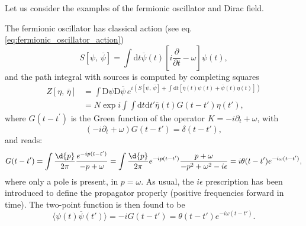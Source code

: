Let us consider the examples of the fermionic oscillator and Dirac field.

\begin{example}
    The fermionic oscillator has classical action (see eq. \eqref{eq:fermionic_oscillator_action})
    \[
        S[\psi,\,\overline{\psi}] = \int \mathrm{d}t \overline{\psi}(t) \left[ i \frac{\partial}{\partial t} - \omega \right] \psi(t),
    \]
    and the path integral with sources is computed by completing squares
    \[
        \begin{aligned}
            Z[\eta,\,\overline{\eta}] & = \int \mathrm{D} \psi \mathrm{D} \overline{\psi} \, e^{i \left( S[\psi,\,\overline{\psi}] + \int \mathrm{d}t \left[ \overline{\eta}(t) \psi(t) + \overline{\psi}(t) \eta(t) \right] \right)} \\
                                      & = N \exp{i \int \int \mathrm{d}t \mathrm{d}t' \overline{\eta}(t) G(t - t') \eta(t')},
        \end{aligned}
    \]
    where \(G(t-t^{\prime})\) is the Green function of the operator \(K = -i \partial_t + \omega\), with
    \[
        \left(-i\partial_t + \omega\right) G(t - t') = \delta(t - t'),
    \]
    and reads:
    \[
        G(t-t^{\prime}) = \int \frac{\d{p}}{2\pi} \frac{e^{-i p (t - t')}}{-p + \omega} = \int \frac{\d{p}}{2\pi} e^{-i p (t - t')} \frac{p+\omega}{-p^2 + \omega^2 - i\epsilon} = i \theta(t - t') e^{-i \omega (t - t')},
    \]
    where only a pole is present, in \(p=\omega\). As usual, the \(i\epsilon\) prescription has been introduced to define the propagator properly (positive frequencies forward in time). The two-point function is then found to be
    \[
        \langle \psi(t) \overline{\psi}(t') \rangle = -i G(t - t') = \theta(t - t') e^{-i \omega (t - t')}.
    \]
\end{example}

